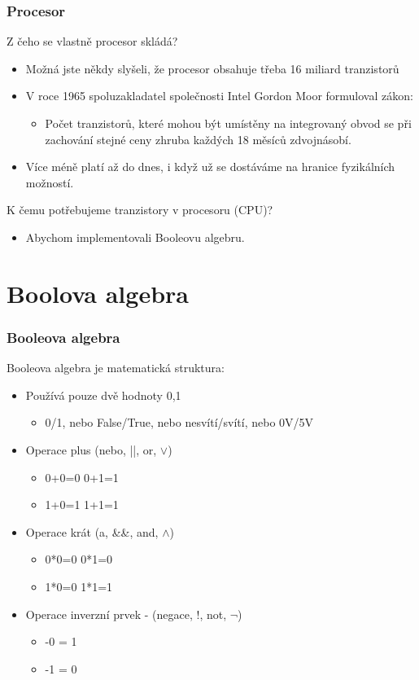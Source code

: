\documentclass{beamer}
\begin{document}
\begin{frame}
\frametitle{Procesor}

Z čeho se vlastně procesor skládá?
\begin{itemize}
\item Možná jste někdy slyšeli, že procesor obsahuje třeba 16 miliard tranzistorů
\item V roce 1965 spoluzakladatel společnosti Intel Gordon Moor formuloval zákon: 
\begin{itemize}
\item Počet tranzistorů, které mohou být umístěny na integrovaný obvod se při zachování stejné ceny zhruba každých 18 měsíců zdvojnásobí.
\end{itemize}
\item Více méně platí až do dnes, i když už se dostáváme na hranice fyzikálních možností.
\end{itemize}

K čemu potřebujeme tranzistory v procesoru (CPU)?
\begin{itemize}
\item Abychom implementovali Booleovu algebru.
\end{itemize}
\end{frame}



\section{Boolova algebra}



\begin{frame}
\frametitle{Booleova algebra}

Booleova algebra je matematická struktura:
\begin{itemize}
\item Používá pouze dvě hodnoty 0,1
\begin{itemize}
\item 0/1, nebo False/True, nebo nesvítí/svítí, nebo 0V/5V
\end{itemize}
\item Operace plus (nebo, ||, or, $\lor$)
\begin{itemize}
\item 0+0=0 \phantom{XXXX}  0+1=1
\item 1+0=1 \phantom{XXXX}  1+1=1
\end{itemize}
\item Operace krát (a, \&\&, and, $\land$)
\begin{itemize}
\item 0*0=0 \phantom{XXXX}  0*1=0
\item 1*0=0 \phantom{XXXX}  1*1=1
\end{itemize}
\item Operace inverzní prvek - (negace, !, not, $\neg$)
\begin{itemize}
\item -0 = 1
\item -1 = 0
\end{itemize}
\end{itemize}
\end{frame}
\end{document}
